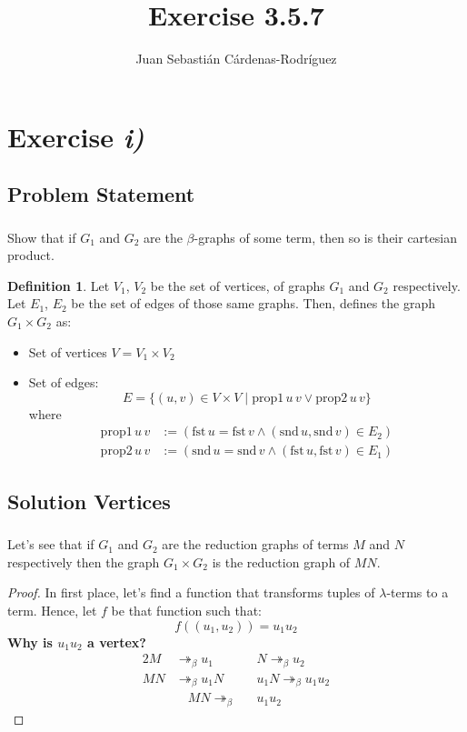 \documentclass{beamer}
\title{Exercise 3.5.7}
\author{Juan Sebasti\'an C\'ardenas-Rodríguez \\
  \scalebox{0.7}{Mathematical Engineering, Universidad EAFIT}}
\theoremstyle{definition}
\newtheorem{definition}{Definition}[section]
\theoremstyle{remark}
\theoremstyle{example}
\newif\ifinsection
\newif\ifinsubsection
\let\oldsection\section
\renewcommand{\section}{
  \global\insectiontrue
  \global\insubsectionfalse
  \oldsection}
\let\oldsubsection\subsection
\renewcommand{\subsection}{
  \global\insubsectiontrue
  \oldsubsection}
\newcommand {\aframe}[1] {
  \begin{frame}
    \ifinsection\frametitle{\secname}\fi
    \ifinsubsection\framesubtitle{\subsecname}\fi
  #1
  \end{frame}
}
\newcommand{\fst}{\mathrm{fst} \,}
\newcommand{\snd}{\mathrm{snd} \,}
\begin{document}
\begin{frame}[plain]
  \titlepage
\end{frame}

\section{Exercise \textit{i)}}
\subsection{Problem Statement}
\aframe{ Show that if $G_1$ and $G_2$ are the $\beta$-graphs of some
  term, then so is their cartesian product. \pause

  \begin{definition}
    Let $V_1$, $V_2$ be the set of vertices, of graphs $G_1$ and $G_2$
    respectively. Let $E_1$, $E_2$ be the set of edges of those same graphs.
    Then,\textcite{harary1969} defines the graph $G_1 \times G_2$ as:
    \begin{itemize}
      \item Set of vertices $V = V_1 \times V_2$ \pause
      \item Set of edges:
            \begin{equation*}
              E = \{(u, v) \in V \times V \mid \mathrm{prop1} \, u \, v \vee
              \mathrm{prop2} \, u \, v\}
            \end{equation*}
            where
            \begin{align*}
              \mathrm{prop1} \, u \, v
              &:= (\fst u = \fst v \wedge (\snd u, \snd v) \in E_2) \\
              \mathrm{prop2} \, u \, v
              &:= (\snd u = \snd v \wedge (\fst u, \fst v) \in E_1)
            \end{align*}
    \end{itemize}
  \end{definition}
}

\subsection{Solution Vertices}
\aframe{Let's see that if $G_1$ and $G_2$ are the reduction graphs of
  terms $M$ and $N$ respectively then the graph $G_1 \times G_2$ is
  the reduction graph of $MN$. \pause
  \begin{proof}
    In first place, let's find a function that transforms tuples of
    $\lambda$-terms to a term. Hence, let $f$ be that function such
    that:
    \begin{equation*}
      f((u_1, u_2)) = u_1u_2
    \end{equation*}
    \pause \textbf{Why is $u_1u_2$ a vertex?} \pause
    \begin{alignat*}{2}
      M &\twoheadrightarrow_\beta u_1  \quad &&N \twoheadrightarrow_\beta u_2 \\
      MN &\twoheadrightarrow_\beta u_1N \quad &&u_1N \twoheadrightarrow_\beta u_1u_2 \\
      &\quad MN \twoheadrightarrow_\beta &&u_1u_2
    \end{alignat*}
  \end{proof}
}
\end{document}
